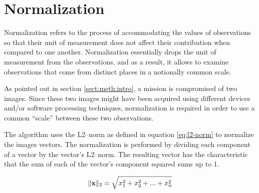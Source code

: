 \section{Normalization} \label{sect:meth:norm}

Normalization refers to the process of accommodating the values of observations so that their unit of measurement does not affect their contribution when compared to one another. Normalization essentially drops the unit of measurement from the observations, and as a result, it allows to examine observations that come from distinct places in a notionally common scale.

As pointed out in section \ref{sect:meth:intro}, a mission is compromised of two images. Since these two images might have been acquired using different devices and/or software processing techniques, normalization is required in order to use a common ``scale'' between these two observations.

The \mlblink algorithm uses the L2--norm as defined in equation \ref{eq:l2-norm} to normalize the images vectors. The normalization is performed by dividing each component of a vector by the vector's L2--norm. The resulting vector has the characteristic that the sum of each of the vector's component squared sums up to 1.

\begin{equation} \label{eq:l2-norm}
    \lVert \boldsymbol{\mathbf{x}} \rVert_{2} = \sqrt{x^2_1 + x^2_2 + ... + x^2_n}
\end{equation}